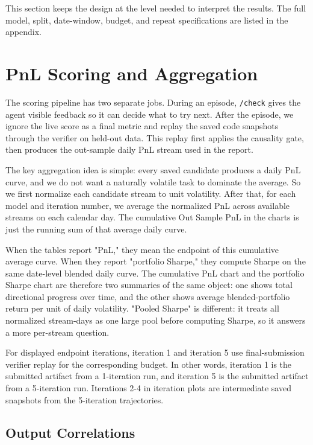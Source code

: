\documentclass[
]{article}
\begin{document}
This section keeps the design at the level needed to interpret the results. The full model, split, date-window, budget, and repeat specifications are listed in the appendix.

\section{PnL Scoring and Aggregation}\label{pnl-scoring-and-aggregation}

The scoring pipeline has two separate jobs. During an episode, \texttt{/check} gives the agent visible feedback so it can decide what to try next. After the episode, we ignore the live score as a final metric and replay the saved code snapshots through the verifier on held-out data. This replay first applies the causality gate, then produces the out-sample daily PnL stream used in the report.

The key aggregation idea is simple: every saved candidate produces a daily PnL curve, and we do not want a naturally volatile task to dominate the average. So we first normalize each candidate stream to unit volatility. After that, for each model and iteration number, we average the normalized PnL across available streams on each calendar day. The cumulative Out Sample PnL in the charts is just the running sum of that average daily curve.

When the tables report "PnL," they mean the endpoint of this cumulative average curve. When they report "portfolio Sharpe," they compute Sharpe on the same date-level blended daily curve. The cumulative PnL chart and the portfolio Sharpe chart are therefore two summaries of the same object: one shows total directional progress over time, and the other shows average blended-portfolio return per unit of daily volatility. "Pooled Sharpe" is different: it treats all normalized stream-days as one large pool before computing Sharpe, so it answers a more per-stream question.

For displayed endpoint iterations, iteration 1 and iteration 5 use final-submission verifier replay for the corresponding budget. In other words, iteration 1 is the submitted artifact from a 1-iteration run, and iteration 5 is the submitted artifact from a 5-iteration run. Iterations 2-4 in iteration plots are intermediate saved snapshots from the 5-iteration trajectories.

\subsection{Output Correlations}\label{output-correlations}
\end{document}
